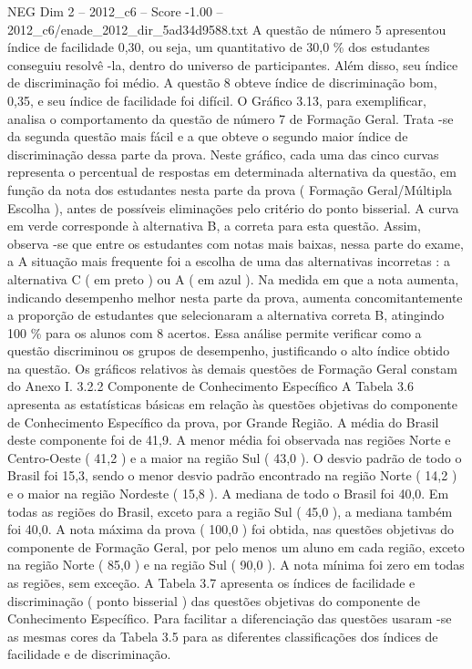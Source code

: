 \begin{textsample}{NEG Dim 2 – 2012\_c6 – Score -1.00 – 2012\_c6/enade\_2012\_dir\_5ad34d9588.txt}
A questão de número 5 apresentou índice de facilidade 0,30, ou seja, um quantitativo de 30,0 \% dos estudantes conseguiu resolvê -la, dentro do universo de participantes.
Além disso, seu índice de discriminação foi médio.
A questão 8 obteve índice de discriminação bom, 0,35, e seu índice de facilidade foi difícil.
O Gráfico 3.13, para exemplificar, analisa o comportamento da questão de número 7 de Formação Geral.
Trata -se da segunda questão mais fácil e a que obteve o segundo maior índice de discriminação dessa parte da prova.
Neste gráfico, cada uma das cinco curvas representa o percentual de respostas em determinada alternativa da questão, em função da nota dos estudantes nesta parte da prova ( Formação Geral/Múltipla Escolha ), antes de possíveis eliminações pelo critério do ponto bisserial.
A curva em verde corresponde à alternativa B, a correta para esta questão.
Assim, observa -se que entre os estudantes com notas mais baixas, nessa parte do exame, a A situação mais frequente foi a escolha de uma das alternativas incorretas : a alternativa C ( em preto ) ou A ( em azul ).
Na medida em que a nota aumenta, indicando desempenho melhor nesta parte da prova, aumenta concomitantemente a proporção de estudantes que selecionaram a alternativa correta B, atingindo 100 \% para os alunos com 8 acertos.
Essa análise permite verificar como a questão discriminou os grupos de desempenho, justificando o alto índice obtido na questão.
Os gráficos relativos às demais questões de Formação Geral constam do Anexo I. 3.2.2 Componente de Conhecimento Específico A Tabela 3.6 apresenta as estatísticas básicas em relação às questões objetivas do componente de Conhecimento Específico da prova, por Grande Região.
A média do Brasil deste componente foi de 41,9.
A menor média foi observada nas regiões Norte e Centro-Oeste ( 41,2 ) e a maior na região Sul ( 43,0 ).
O desvio padrão de todo o Brasil foi 15,3, sendo o menor desvio padrão encontrado na região Norte ( 14,2 ) e o maior na região Nordeste ( 15,8 ).
A mediana de todo o Brasil foi 40,0.
Em todas as regiões do Brasil, exceto para a região Sul ( 45,0 ), a mediana também foi 40,0.
A nota máxima da prova ( 100,0 ) foi obtida, nas questões objetivas do componente de Formação Geral, por pelo menos um aluno em cada região, exceto na região Norte ( 85,0 ) e na região Sul ( 90,0 ).
A nota mínima foi zero em todas as regiões, sem exceção.
A Tabela 3.7 apresenta os índices de facilidade e discriminação ( ponto bisserial ) das questões objetivas do componente de Conhecimento Específico.
Para facilitar a diferenciação das questões usaram -se as mesmas cores da Tabela 3.5 para as diferentes classificações dos índices de facilidade e de discriminação.

\end{textsample}
